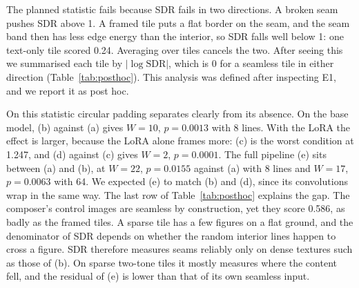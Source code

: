 \documentclass[conference]{IEEEtran}
\begin{document}
The planned statistic fails because SDR fails in two directions. A broken seam pushes SDR above 1. A framed tile puts a flat border on the seam, and the seam band then has less edge energy than the interior, so SDR falls well below 1: one text-only tile scored 0.24. Averaging over tiles cancels the two. After seeing this we summarised each tile by $|\log \mathrm{SDR}|$, which is 0 for a seamless tile in either direction (Table~\ref{tab:posthoc}). This analysis was defined after inspecting E1, and we report it as post hoc.

\begin{table}[t]
\caption{E1 post hoc: $|\log \mathrm{SDR}|$ (0 is seamless), mean $\pm$ std over 16 tiles, with the planned 8 interior lines and with 64.}
\label{tab:posthoc}
\centering
{}
\end{table}

On this statistic circular padding separates clearly from its absence. On the base model, (b) against (a) gives $W = 10$, $p = 0.0013$ with 8 lines. With the LoRA the effect is larger, because the LoRA alone frames more: (c) is the worst condition at 1.247, and (d) against (c) gives $W = 2$, $p = 0.0001$. The full pipeline (e) sits between (a) and (b), at $W = 22$, $p = 0.0155$ against (a) with 8 lines and $W = 17$, $p = 0.0063$ with 64. We expected (e) to match (b) and (d), since its convolutions wrap in the same way. The last row of Table~\ref{tab:posthoc} explains the gap. The composer's control images are seamless by construction, yet they score 0.586, as badly as the framed tiles. A sparse tile has a few figures on a flat ground, and the denominator of SDR depends on whether the random interior lines happen to cross a figure. SDR therefore measures seams reliably only on dense textures such as those of (b). On sparse two-tone tiles it mostly measures where the content fell, and the residual of (e) is lower than that of its own seamless input.
\end{document}
